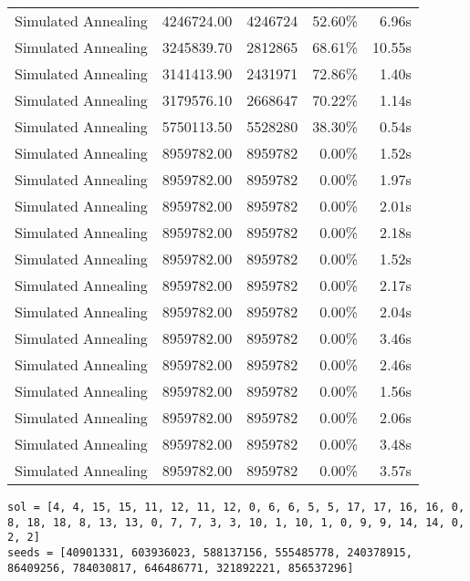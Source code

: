 \begin{table}[ht]
\begin{tabular}{|r|r|r|r|r|}
Simulated Annealing & 4246724.00 & 4246724 & 52.60\% & 6.96s\\
Simulated Annealing & 3245839.70 & 2812865 & 68.61\% & 10.55s\\
Simulated Annealing & 3141413.90 & 2431971 & 72.86\% & 1.40s\\
Simulated Annealing & 3179576.10 & 2668647 & 70.22\% & 1.14s\\
Simulated Annealing & 5750113.50 & 5528280 & 38.30\% & 0.54s\\
Simulated Annealing & 8959782.00 & 8959782 & 0.00\% & 1.52s\\
Simulated Annealing & 8959782.00 & 8959782 & 0.00\% & 1.97s\\
Simulated Annealing & 8959782.00 & 8959782 & 0.00\% & 2.01s\\
Simulated Annealing & 8959782.00 & 8959782 & 0.00\% & 2.18s\\
Simulated Annealing & 8959782.00 & 8959782 & 0.00\% & 1.52s\\
Simulated Annealing & 8959782.00 & 8959782 & 0.00\% & 2.17s\\
Simulated Annealing & 8959782.00 & 8959782 & 0.00\% & 2.04s\\
Simulated Annealing & 8959782.00 & 8959782 & 0.00\% & 3.46s\\
Simulated Annealing & 8959782.00 & 8959782 & 0.00\% & 2.46s\\
Simulated Annealing & 8959782.00 & 8959782 & 0.00\% & 1.56s\\
Simulated Annealing & 8959782.00 & 8959782 & 0.00\% & 2.06s\\
Simulated Annealing & 8959782.00 & 8959782 & 0.00\% & 3.48s\\
Simulated Annealing & 8959782.00 & 8959782 & 0.00\% & 3.57s\\
\end{tabular}%
\end{table}
\begin{lstlisting}[label={lst:call18vehicle5},caption=Optimal solution call\_18\_vehicle\_5]
sol = [4, 4, 15, 15, 11, 12, 11, 12, 0, 6, 6, 5, 5, 17, 17, 16, 16, 0, 8, 18, 18, 8, 13, 13, 0, 7, 7, 3, 3, 10, 1, 10, 1, 0, 9, 9, 14, 14, 0, 2, 2]
seeds = [40901331, 603936023, 588137156, 555485778, 240378915, 86409256, 784030817, 646486771, 321892221, 856537296]
\end{lstlisting}%
\clearpage


